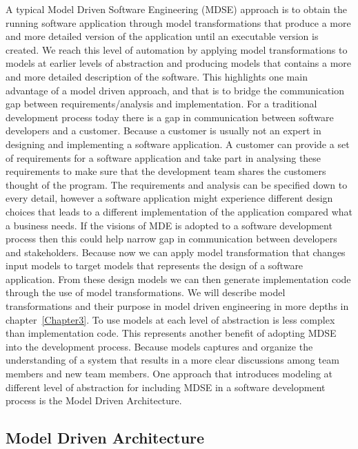 A typical Model Driven Software Engineering (MDSE) approach is to obtain the
running software application through model transformations that produce a more
and more detailed version of the application until an executable version is
created. We reach this level of automation by applying model transformations to
models at earlier levels of abstraction and producing models that contains a
more and more detailed description of the software. This highlights one main
advantage of a model driven approach, and that is to bridge the communication
gap between requirements/analysis and implementation\cite{Brown2008}. For a
traditional development process today there is a gap in communication between
software developers and a customer. Because a customer is usually not an expert
in designing and implementing a software application. A customer can provide a
set of requirements for a software application and take part in analysing these
requirements to make sure that the development team shares the customers thought
of the program. The requirements and analysis can be specified down to every
detail, however a software application might experience different design choices
that leads to a different implementation of the application compared what a
business needs. If the visions of MDE is adopted to a software development
process then this could help narrow gap in communication between developers and
stakeholders. Because now we can apply model transformation that changes input
models to target models that represents the design of a software application.
From these design models we can then generate implementation code through the use
of model transformations. We will describe model transformations and their
purpose in model driven engineering in more depths in chapter~\ref{Chapter3}.
To use models at each level of abstraction is less complex than implementation
code. This represents another benefit of adopting MDSE into the development
process. Because models captures and organize the understanding of a system that
results in a more clear discussions among team members and new team members. 
One approach that introduces modeling at different level of abstraction for
including MDSE in a software development process is the Model Driven
Architecture.

\subsection{Model Driven Architecture}
\label{MDA}

